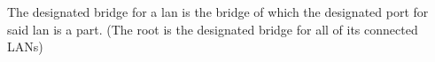 The designated bridge for a lan is the bridge of which the designated port for said lan is a part. (The root is the designated bridge for all of its connected LANs)